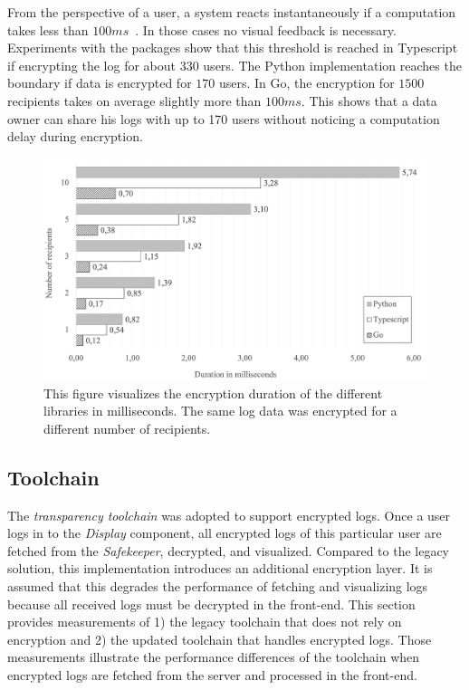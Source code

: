 \documentclass[../main.tex]{subfiles}
\begin{document}
From the perspective of a user, a system reacts instantaneously if a computation takes less than $100ms$~\cite{Nielson1993}.
In those cases no visual feedback is necessary.
Experiments with the packages show that this threshold is reached in Typescript if encrypting the log for about $330$ users.
The Python implementation reaches the boundary if data is encrypted for $170$ users.
In Go, the encryption for $1500$ recipients takes on average slightly more than $100ms$.
This shows that a data owner can share his logs with up to 170 users without noticing a computation delay during encryption.


\begin{figure}[ht]
    \includegraphics[scale=0.6]{../img/07/performance.png}
    \centering
    \caption[Encryption duration]{This figure visualizes the encryption duration of the different libraries in milliseconds. The same log data was encrypted for a different number of recipients.}
    \label{fig:performance}
\end{figure}

\subsection{Toolchain}
\label{sec:evaluation-perf-toolchain}
The \emph{transparency toolchain} was adopted to support encrypted logs.
Once a user logs in to the \emph{Display} component, all encrypted logs of this particular user are fetched from the \emph{Safekeeper}, decrypted, and visualized.
Compared to the legacy solution, this implementation introduces an additional encryption layer.
It is assumed that this degrades the performance of fetching and visualizing logs because all received logs must be decrypted in the front-end.
This section provides measurements of 
1) the legacy toolchain that does not rely on encryption and
2) the updated toolchain that handles encrypted logs.
Those measurements illustrate the performance differences of the toolchain when encrypted logs are fetched from the server and processed in the front-end.
\end{document}
